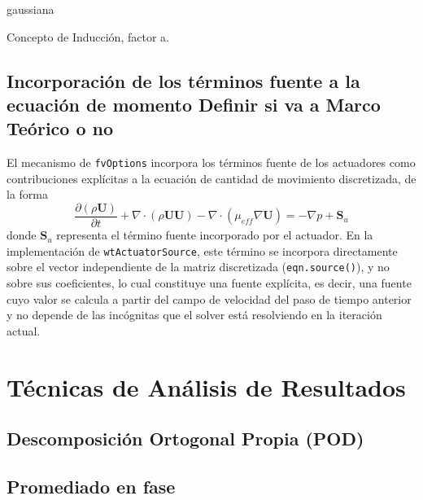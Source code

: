 gaussiana

Concepto de Inducción, factor a.

\subsection{Incorporación de los términos fuente a la ecuación de momento \Large Definir si va a Marco Teórico o no}
El mecanismo de \texttt{fvOptions} incorpora los términos fuente de los actuadores como contribuciones explícitas a la ecuación de cantidad de movimiento discretizada, de la forma
\begin{equation}
    \frac{\partial (\rho \mathbf{U})}{\partial t} + \nabla \cdot (\rho \mathbf{U} \mathbf{U}) - \nabla \cdot (\mu_{eff} \nabla \mathbf{U}) = -\nabla p + \mathbf{S}_{u}
\end{equation}
donde $\mathbf{S}_{u}$ representa el término fuente incorporado por el actuador. En la implementación de \texttt{wtActuatorSource}, este término se incorpora directamente sobre el vector independiente de la matriz discretizada (\texttt{eqn.source()}), y no sobre sus coeficientes, lo cual constituye una fuente explícita, es decir, una fuente cuyo valor se calcula a partir del campo de velocidad del paso de tiempo anterior y no depende de las incógnitas que el solver está resolviendo en la iteración actual.

\section{Técnicas de Análisis de Resultados}

\subsection{Descomposición Ortogonal Propia (POD)}
\subsection{Promediado en fase}
